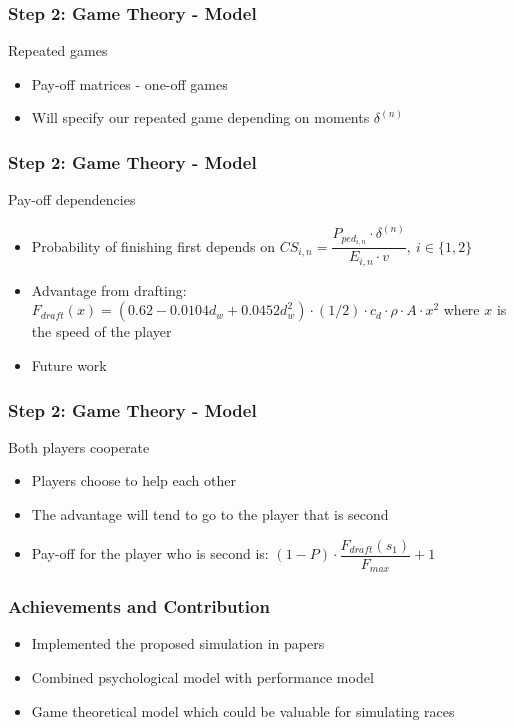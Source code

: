 \documentclass{beamer}
\begin{document}
\begin{frame}
\frametitle{Step 2: Game Theory - Model}
\begin{block}{Repeated games}
	\begin{itemize}
		\item Pay-off matrices - one-off games
		\item Will specify our repeated game depending on moments $\delta^{(n)}$
	\end{itemize}
\end{block}
\end{frame}

\begin{frame}
\frametitle{Step 2: Game Theory - Model}
\begin{block}{Pay-off dependencies}
	\begin{itemize}
		\item Probability of finishing first depends on $CS_{i,n} = \dfrac{P_{ped_{i,n}} \cdot \delta^{(n)}}{E_{i,n} \cdot v},\ i\in\{1,2\}$
		\item Advantage from drafting: $F_{draft}(x) = (0.62 - 0.0104 d_w + 0.0452 d_w^2)\cdot (1/2)\cdot c_d\cdot \rho\cdot A\cdot x^2$ where $x$ is the speed of the player
		\item Future work
	\end{itemize}
\end{block}
\end{frame}

\begin{frame}
\frametitle{Step 2: Game Theory - Model}
\begin{block}{Both players cooperate}
	\begin{itemize}
		\item Players choose to help each other
		\item The advantage will tend to go to the player that is second
		\item Pay-off for the player who is second is: $(1-P)\cdot \dfrac{F_{draft}(s_1)}{F_{max}} + 1$
	\end{itemize}
\end{block}
\end{frame}

\begin{frame}
\frametitle{Achievements and Contribution}

\begin{itemize}
	\item Implemented the proposed simulation in papers %
	\item Combined psychological model with performance model
	\item Game theoretical model which could be valuable for simulating races
\end{itemize}

\end{frame}
\end{document}
